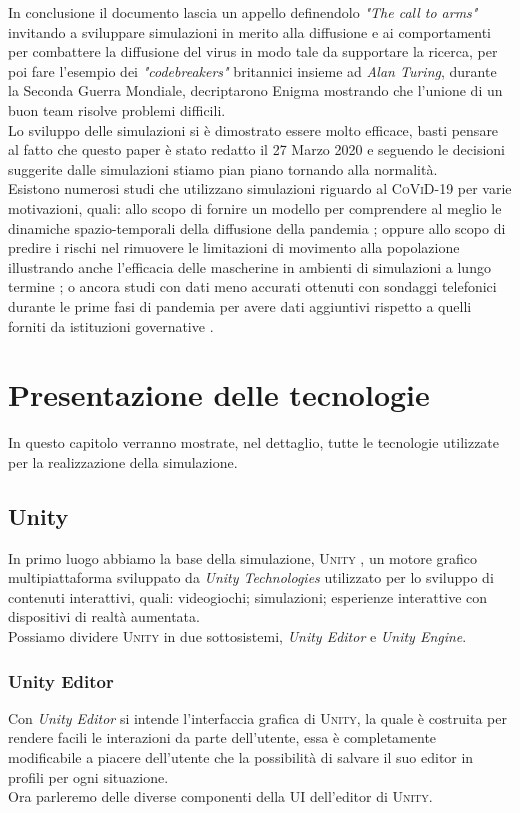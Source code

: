 \documentclass[12pt, openany]{book}
\begin{document}
	In conclusione il documento lascia un appello definendolo \emph{"The call to arms"} invitando a sviluppare simulazioni in merito alla diffusione e ai comportamenti per combattere la diffusione del virus in modo tale da supportare la ricerca, per poi fare l'esempio dei \emph{"codebreakers"} britannici insieme ad \emph{Alan Turing}, durante la Seconda Guerra Mondiale, decriptarono Enigma mostrando che l'unione di un buon team risolve problemi difficili.\\
	Lo sviluppo delle simulazioni si è dimostrato essere molto efficace, basti pensare al fatto che questo paper è stato redatto il 27 Marzo 2020 e seguendo le decisioni suggerite dalle simulazioni stiamo pian piano tornando alla normalità.\\
	
	Esistono numerosi studi che utilizzano simulazioni riguardo al \textsc{CoViD-19} per varie motivazioni, quali: allo scopo di fornire un modello per comprendere al meglio le dinamiche spazio-temporali della diffusione della pandemia \cite{Singapore}; oppure allo scopo di predire i rischi nel rimuovere le limitazioni di movimento alla popolazione illustrando anche l'efficacia delle mascherine in ambienti di simulazioni a lungo termine \cite{Madrid}; o ancora studi con dati meno accurati ottenuti con sondaggi telefonici durante le prime fasi di pandemia per avere dati aggiuntivi rispetto a quelli forniti da istituzioni governative \cite{HongKong}.
	\chapter{Presentazione delle tecnologie}
	In questo capitolo verranno mostrate, nel dettaglio, tutte le tecnologie utilizzate per la realizzazione della simulazione.
	\section{Unity}
	In primo luogo abbiamo la base della simulazione, \textsc{Unity} \cite{Unity}, un motore grafico multipiattaforma sviluppato da \emph{Unity Technologies} utilizzato per lo sviluppo di contenuti interattivi, quali: videogiochi; simulazioni; esperienze interattive con dispositivi di realtà aumentata. \\
	Possiamo dividere \textsc{Unity} in due sottosistemi,\emph{ Unity Editor} e \emph{Unity Engine}. 
	\subsection{Unity Editor}
	Con \emph{Unity Editor} si intende l'interfaccia grafica di \textsc{Unity}, la quale è costruita per rendere facili le interazioni da parte dell'utente, essa è completamente modificabile a piacere dell'utente che la possibilità di salvare il suo editor in profili per ogni situazione.\\
	Ora parleremo delle diverse componenti della UI dell'editor di \textsc{Unity}.
\end{document}
